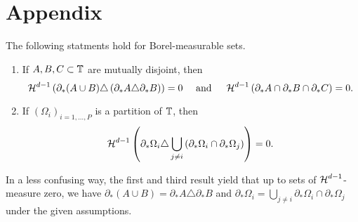 \chapter{Appendix}

\begin{lemma}
	\label{identities_for_measure_theoretic_boundaries}
	The following statments hold for Borel-measurable sets.
	\begin{enumerate}
		\item 
		\label{item_disjoint_sets}
		If $ A, B, C \subset \operatorname{\mathbb{T}} $ are mutually disjoint, then
		\begin{equation*}	
			\operatorname{\mathcal{H}}^{ d - 1 } \left(
				\partial_{ \ast } ( A \cup B ) 
				\triangle  
				\left( \partial_{ \ast } A \triangle \partial_{ \ast } B \right)
			\right)
			=
			0
			\quad 
			\text{ and }
			\quad
			\operatorname{\mathcal{H}}^{ d - 1 } \left(
				\partial_{ \ast } A
				\cap
				\partial_{ \ast } B
				\cap
				\partial_{ \ast } C
			\right)
			=
			0.
		\end{equation*}
		
		\item 
		\label{rewriting_boundary_via_interfaces}
		If $ ( \Omega_{ i } )_{ i = 1 , \dotsc , P } $ is a partition of $ \operatorname{\mathbb{T}} $, then
		\begin{equation*}
			\operatorname{\mathcal{H}}^{ d - 1 } \left(
				\partial_{ \ast } \Omega_{ i }
				\triangle
				\bigcup_{ j \neq i }
				\left(\partial_{ \ast } \Omega_{ i }
				\cap
				\partial_{ \ast } \Omega_{ j }
				\right)
			\right) = 0.
		\end{equation*}
	\end{enumerate}
\end{lemma}

\begin{remark}
	In a less confusing way, the first and third result yield that up to 
	sets 
	of $ \operatorname{\mathcal{H}}^{ d - 1 } $-measure zero, we have
	$  \partial_{ \ast } ( A \cup B ) 
	=  
	 \partial_{ \ast } A \triangle \partial_{ \ast } B
	$
	and
	$
	\partial_{ \ast } \Omega_{ i }
	=
	\bigcup_{ j \neq i }
	\partial_{ \ast } \Omega_{ i }
	\cap
	\partial_{ \ast } \Omega_{ j }
	$
	under the given assumptions.
\end{remark}

